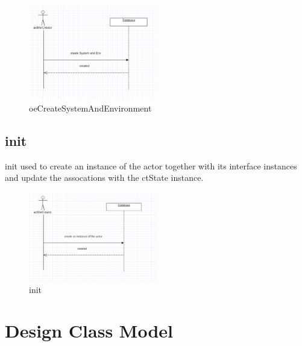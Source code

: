 \begin{figure}[H]
\begin{center}
\includegraphics[width=0.5\textwidth]{./images/oeCreateSystemAndEnvironment.eps} 
\end{center}
\caption{oeCreateSystemAndEnvironment}
\end{figure}

\subsection{init}
init used to create an instance of the actor together with its interface
instances and update the assocations with the ctState instance.

\begin{figure}[H]
\begin{center}
\includegraphics[width=0.5\textwidth]{./images/init.eps} 
\end{center}
\caption{init}
\end{figure}




\section{Design Class Model}
	

